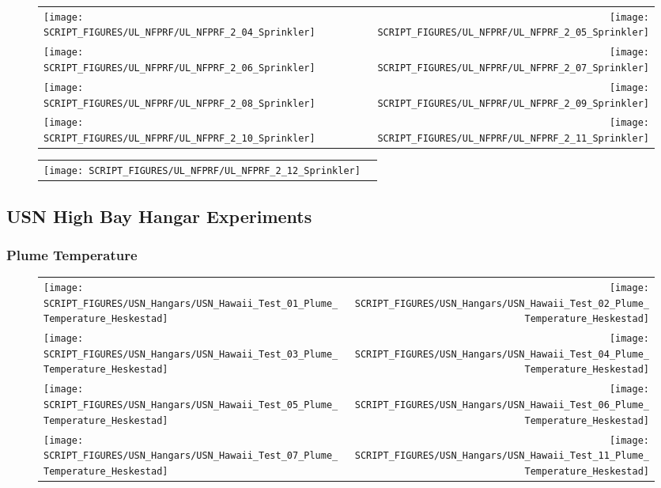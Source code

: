 \begin{figure}[p]
\begin{tabular*}{\textwidth}{l@{\extracolsep{\fill}}r}
\texttt{[image: SCRIPT\_FIGURES/UL\_NFPRF/UL\_NFPRF\_2\_04\_Sprinkler]} &
\texttt{[image: SCRIPT\_FIGURES/UL\_NFPRF/UL\_NFPRF\_2\_05\_Sprinkler]} \\
\texttt{[image: SCRIPT\_FIGURES/UL\_NFPRF/UL\_NFPRF\_2\_06\_Sprinkler]} &
\texttt{[image: SCRIPT\_FIGURES/UL\_NFPRF/UL\_NFPRF\_2\_07\_Sprinkler]} \\
\texttt{[image: SCRIPT\_FIGURES/UL\_NFPRF/UL\_NFPRF\_2\_08\_Sprinkler]} &
\texttt{[image: SCRIPT\_FIGURES/UL\_NFPRF/UL\_NFPRF\_2\_09\_Sprinkler]} \\
\texttt{[image: SCRIPT\_FIGURES/UL\_NFPRF/UL\_NFPRF\_2\_10\_Sprinkler]} &
\texttt{[image: SCRIPT\_FIGURES/UL\_NFPRF/UL\_NFPRF\_2\_11\_Sprinkler]}
\end{tabular*}
\end{figure}

\begin{figure}[p]
\begin{tabular*}{\textwidth}{l@{\extracolsep{\fill}}r}
\texttt{[image: SCRIPT\_FIGURES/UL\_NFPRF/UL\_NFPRF\_2\_12\_Sprinkler]}
\end{tabular*}
\end{figure}

\clearpage

\subsection{USN High Bay Hangar Experiments}

\subsubsection{Plume Temperature}

\begin{figure}[p]
\begin{tabular*}{\textwidth}{l@{\extracolsep{\fill}}r}
\texttt{[image: SCRIPT\_FIGURES/USN\_Hangars/USN\_Hawaii\_Test\_01\_Plume\_Temperature\_Heskestad]} &
\texttt{[image: SCRIPT\_FIGURES/USN\_Hangars/USN\_Hawaii\_Test\_02\_Plume\_Temperature\_Heskestad]} \\
\texttt{[image: SCRIPT\_FIGURES/USN\_Hangars/USN\_Hawaii\_Test\_03\_Plume\_Temperature\_Heskestad]} &
\texttt{[image: SCRIPT\_FIGURES/USN\_Hangars/USN\_Hawaii\_Test\_04\_Plume\_Temperature\_Heskestad]} \\
\texttt{[image: SCRIPT\_FIGURES/USN\_Hangars/USN\_Hawaii\_Test\_05\_Plume\_Temperature\_Heskestad]} &
\texttt{[image: SCRIPT\_FIGURES/USN\_Hangars/USN\_Hawaii\_Test\_06\_Plume\_Temperature\_Heskestad]} \\
\texttt{[image: SCRIPT\_FIGURES/USN\_Hangars/USN\_Hawaii\_Test\_07\_Plume\_Temperature\_Heskestad]} &
\texttt{[image: SCRIPT\_FIGURES/USN\_Hangars/USN\_Hawaii\_Test\_11\_Plume\_Temperature\_Heskestad]}
\end{tabular*}
\end{figure}


